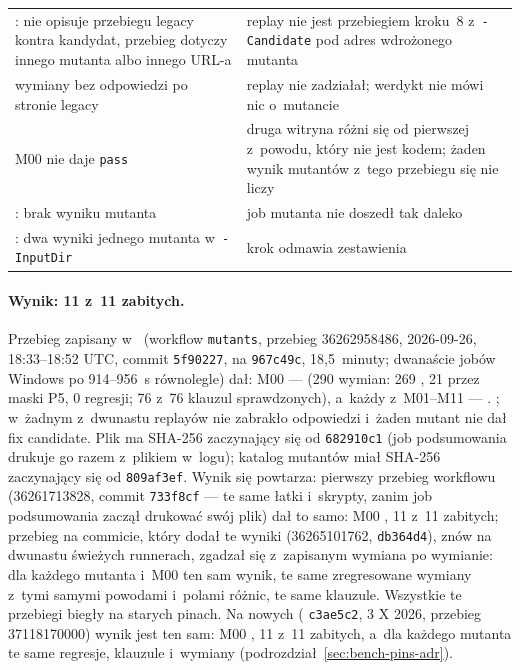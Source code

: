 {\begin{xltabular}{\linewidth}{@{}>{\raggedright\arraybackslash}X >{\raggedright\arraybackslash}X@{}}
:  nie opisuje przebiegu legacy kontra
  kandydat, przebieg dotyczy innego mutanta albo innego URL-a & replay nie jest przebiegiem
  kroku~8 z~\texttt{-Candidate} pod adres wdrożonego mutanta \\
wymiany bez odpowiedzi po stronie legacy & replay nie zadziałał; werdykt nie mówi nic
  o~mutancie \\
M00 nie daje \texttt{pass} & druga witryna różni się od pierwszej z~powodu, który nie jest
  kodem; żaden wynik mutantów z~tego przebiegu się nie liczy \\
: brak wyniku mutanta & job mutanta nie doszedł tak daleko \\
: dwa wyniki jednego mutanta w~\texttt{-InputDir} & krok
  odmawia zestawienia \\
\end{xltabular}
}

\paragraph{Wynik: 11 z~11 zabitych.} Przebieg zapisany w~ (workflow
\texttt{mutants}, przebieg 36262958486, 2026-09-26, 18:33--18:52 UTC, commit
\texttt{5f90227},  na \texttt{967c49c}, 18,5~minuty; dwanaście jobów Windows po
914--956~s równolegle) dał: M00 ---  (290 wymian: 269 , 21
 przez maski P5, 0 regresji; 76 z~76 klauzul sprawdzonych),
a~każdy z~M01--M11 --- . ; w~żadnym z~dwunastu replayów nie zabrakło odpowiedzi i~żaden
mutant nie dał fix candidate. Plik  ma SHA-256 zaczynający się
od \texttt{682910c1} (job podsumowania drukuje go razem z~plikiem w~logu); katalog mutantów
miał SHA-256 zaczynający się od \texttt{809af3ef}. Wynik się powtarza: pierwszy przebieg
workflowu (36261713828, commit \texttt{733f8cf} --- te same łatki i~skrypty, zanim job
podsumowania zaczął drukować swój plik) dał to samo: M00 , 11 z~11 zabitych;
przebieg na commicie, który dodał te wyniki (36265101762, \texttt{db364d4}), znów na
dwunastu świeżych runnerach, zgadzał się z~zapisanym wymiana po wymianie: dla każdego
mutanta i~M00 ten sam wynik, te same zregresowane wymiany z~tymi samymi powodami i~polami
różnic, te same klauzule. Wszystkie te przebiegi biegły na starych pinach. Na nowych
( \texttt{c3ae5c2}, 3 X 2026, przebieg 37118170000) wynik jest ten sam: M00
, 11 z~11 zabitych, a~dla każdego mutanta te same regresje, klauzule
i~wymiany (podrozdział~\ref{sec:bench-pins-adr}).

